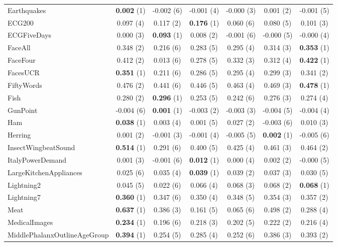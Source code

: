 \begin{table}[ht]
\begin{adjustbox}{width=\textwidth}
\begin{tabular}{lcccccc}
    Earthquakes & \textbf{0.002} (1) & -0.002 (6) & -0.001 (4) & -0.000 (3) & 0.001 (2) & -0.001 (5) \\
    ECG200 & 0.097 (4) & 0.117 (2) & \textbf{0.176} (1) & 0.060 (6) & 0.080 (5) & 0.101 (3) \\
    ECGFiveDays & 0.000 (3) & \textbf{0.093} (1) & 0.008 (2) & -0.001 (6) & -0.000 (5) & -0.000 (4) \\
    FaceAll & 0.348 (2) & 0.216 (6) & 0.283 (5) & 0.295 (4) & 0.314 (3) & \textbf{0.353} (1) \\
    FaceFour & 0.412 (2) & 0.013 (6) & 0.278 (5) & 0.332 (3) & 0.312 (4) & \textbf{0.422} (1) \\
    FacesUCR & \textbf{0.351} (1) & 0.211 (6) & 0.286 (5) & 0.295 (4) & 0.299 (3) & 0.341 (2) \\
    FiftyWords & 0.476 (2) & 0.441 (6) & 0.446 (5) & 0.463 (4) & 0.469 (3) & \textbf{0.478} (1) \\
    Fish & 0.280 (2) & \textbf{0.296} (1) & 0.253 (5) & 0.242 (6) & 0.276 (3) & 0.274 (4) \\
    GunPoint & -0.004 (6) & \textbf{0.001} (1) & -0.003 (2) & -0.003 (3) & -0.004 (5) & -0.004 (4) \\
    Ham & \textbf{0.038} (1) & 0.003 (4) & 0.001 (5) & 0.027 (2) & -0.003 (6) & 0.010 (3) \\
    Herring & 0.001 (2) & -0.001 (3) & -0.001 (4) & -0.005 (5) & \textbf{0.002} (1) & -0.005 (6) \\
    InsectWingbeatSound & \textbf{0.514} (1) & 0.291 (6) & 0.400 (5) & 0.425 (4) & 0.461 (3) & 0.464 (2) \\
    ItalyPowerDemand & 0.001 (3) & -0.001 (6) & \textbf{0.012} (1) & 0.000 (4) & 0.002 (2) & -0.000 (5) \\
    LargeKitchenAppliances & 0.025 (6) & 0.035 (4) & \textbf{0.039} (1) & 0.039 (2) & 0.037 (3) & 0.030 (5) \\
    Lightning2 & 0.045 (5) & 0.022 (6) & 0.066 (4) & 0.068 (3) & 0.068 (2) & \textbf{0.068} (1) \\
    Lightning7 & \textbf{0.360} (1) & 0.347 (6) & 0.350 (4) & 0.348 (5) & 0.354 (3) & 0.357 (2) \\
    Meat & \textbf{0.637} (1) & 0.386 (3) & 0.161 (5) & 0.065 (6) & 0.498 (2) & 0.288 (4) \\
    MedicalImages & \textbf{0.234} (1) & 0.196 (6) & 0.218 (3) & 0.202 (5) & 0.222 (2) & 0.216 (4) \\
    MiddlePhalanxOutlineAgeGroup & \textbf{0.394} (1) & 0.254 (5) & 0.285 (4) & 0.252 (6) & 0.386 (3) & 0.393 (2) \\

\end{tabular}
\end{adjustbox}
\end{table}
